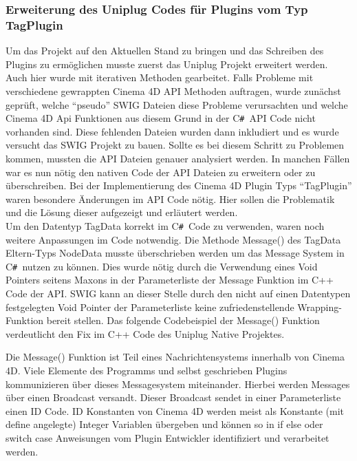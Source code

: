 \documentclass[pagesize, paper=a4, fontsize=12pt, titlepage=true, headings=small, headnosepline, abstractoff, liststotoc, nochapterprefix, plainheadsepline, twoside]{scrreprt}
\newcommand{\CSS}{C\texttt{\# }}
\begin{document}
\subsubsection{Erweiterung des Uniplug Codes für Plugins vom Typ TagPlugin}
Um das Projekt auf den Aktuellen Stand zu bringen und das Schreiben des Plugins zu ermöglichen musste zuerst das Uniplug Projekt erweitert werden. Auch hier wurde mit iterativen Methoden gearbeitet. Falls Probleme mit verschiedene gewrappten Cinema 4D API Methoden auftragen, wurde zunächst geprüft, welche “pseudo” SWIG Dateien diese Probleme verursachten und welche Cinema 4D Api Funktionen aus diesem Grund in der \CSS API Code nicht vorhanden sind. Diese fehlenden Dateien wurden dann inkludiert und es wurde versucht das SWIG Projekt zu bauen. Sollte es bei diesem Schritt zu Problemen kommen, mussten die API Dateien genauer analysiert werden. In manchen Fällen war es nun nötig den nativen Code der API Dateien zu erweitern oder zu überschreiben. Bei der Implementierung des Cinema 4D Plugin Typs “TagPlugin” waren besondere Änderungen im API Code nötig. Hier sollen die Problematik und die Lösung dieser aufgezeigt und erläutert werden.
\\


Um den Datentyp TagData korrekt im \CSS Code zu verwenden, waren noch weitere Anpassungen im Code notwendig. Die Methode Message() des TagData Eltern-Typs NodeData musste überschrieben werden um das Message System in \CSS nutzen zu können. Dies wurde nötig durch die Verwendung eines Void Pointers seitens Maxons in der Parameterliste der Message Funktion im C++ Code der API. SWIG kann an dieser Stelle durch den nicht auf einen Datentypen festgelegten Void Pointer der Parameterliste keine zufriedenstellende Wrapping-Funktion bereit stellen. Das folgende Codebeispiel der Message() Funktion verdeutlicht den Fix im C++ Code des Uniplug Native Projektes.

Die Message() Funktion ist Teil eines Nachrichtensystems innerhalb von Cinema 4D. Viele Elemente des Programms und selbst geschrieben Plugins kommunizieren über dieses Messagesystem miteinander. Hierbei werden Messages über einen Broadcast versandt. Dieser Broadcast sendet in einer Parameterliste einen ID Code. ID Konstanten von Cinema 4D werden meist als Konstante (mit define angelegte) Integer Variablen übergeben und können so in if else oder switch case Anweisungen vom Plugin Entwickler identifiziert und verarbeitet werden.
\end{document}
